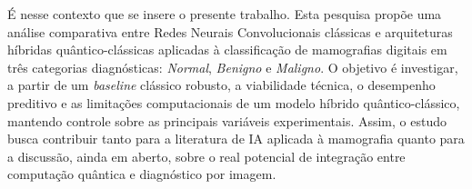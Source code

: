 É nesse contexto que se insere o presente trabalho. Esta pesquisa propõe uma análise comparativa entre Redes Neurais Convolucionais clássicas e arquiteturas híbridas quântico-clássicas aplicadas à classificação de mamografias digitais em três categorias diagnósticas: \textit{Normal}, \textit{Benigno} e \textit{Maligno}. O objetivo é investigar, a partir de um \textit{baseline} clássico robusto, a viabilidade técnica, o desempenho preditivo e as limitações computacionais de um modelo híbrido quântico-clássico, mantendo controle sobre as principais variáveis experimentais. Assim, o estudo busca contribuir tanto para a literatura de IA aplicada à mamografia quanto para a discussão, ainda em aberto, sobre o real potencial de integração entre computação quântica e diagnóstico por imagem.
